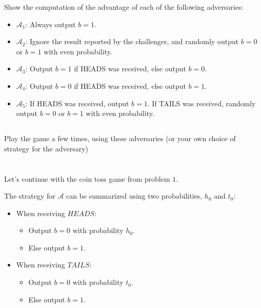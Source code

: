 \documentclass[12pt]{article}
\begin{document}
Show the computation of the advantage of each of the following adversaries:
\begin{itemize}
\item $\mathcal{A}_1$: Always output $b = 1$.
\item $\mathcal{A}_2$: Ignore the result reported by the challenger, and randomly output $b = 0$ or $b = 1$ with even probability.
\item $\mathcal{A}_3$: Output $b = 1$ if HEADS was received, else output $b = 0$.
\item $\mathcal{A}_4$: Output $b = 0$ if HEADS was received, else output $b = 1$.
\item $\mathcal{A}_5$: If HEADS was received, output $b = 1$. If TAILS was received, randomly output $b = 0$ or $b = 1$ with even probability.
\end{itemize}





\subsection{}

Play the game a few times, using these adversaries (or your own choice of strategy for the adversary)

\newpage
\section{}

Let's continue with the coin toss game from problem $1$.

The strategy for $\mathcal{A}$ can be summarized using two probabilities, $h_0$ and $t_0$:

\begin{itemize}
\item When receiving $HEADS$:
\begin{itemize}
\item Output $b = 0$ with probability $h_0$.
\item Else output $b=1$.
\end{itemize}

\item When receiving $TAILS$:
\begin{itemize}
\item Output $b = 0$ with probability $t_0$.
\item Else output $b=1$.
\end{itemize}
\end{itemize}
\end{document}
